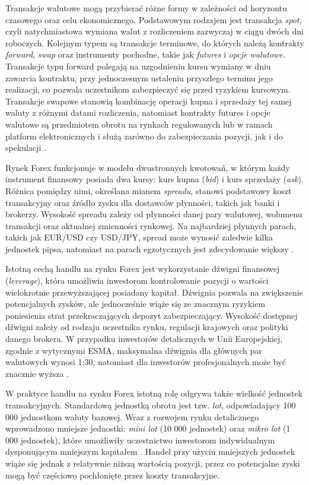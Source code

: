 Transakcje walutowe mogą przybierać różne formy w zależności od horyzontu czasowego oraz celu ekonomicznego. 
Podstawowym rodzajem jest transakcja \textit{spot}, czyli natychmiastowa wymiana walut z rozliczeniem zazwyczaj w ciągu dwóch dni roboczych. 
Kolejnym typem są transakcje terminowe, do których należą kontrakty \textit{forward}, \textit{swap} oraz instrumenty pochodne, takie jak \textit{futures} i \textit{opcje walutowe}. 
Transakcje typu forward polegają na uzgodnieniu kursu wymiany w dniu zawarcia kontraktu, przy jednoczesnym ustaleniu przyszłego terminu jego realizacji, 
co pozwala uczestnikom zabezpieczyć się przed ryzykiem kursowym. Transakcje swapowe stanowią kombinację operacji kupna i sprzedaży tej samej waluty z różnymi datami rozliczenia, 
natomiast kontrakty futures i opcje walutowe są przedmiotem obrotu na rynkach regulowanych lub w ramach platform elektronicznych i służą zarówno do zabezpieczania pozycji, 
jak i do spekulacji \parencite{hull2018}.

Rynek Forex funkcjonuje w modelu dwustronnych kwotowań, w którym każdy instrument finansowy posiada dwa kursy: kurs kupna (\textit{bid}) i kurs sprzedaży (\textit{ask}). 
Różnica pomiędzy nimi, określana mianem \textit{spreadu}, stanowi podstawowy koszt transakcyjny oraz źródło zysku dla dostawców płynności, takich jak banki i brokerzy. 
Wysokość spreadu zależy od płynności danej pary walutowej, wolumenu transakcji oraz aktualnej zmienności rynkowej. 
Na najbardziej płynnych parach, takich jak EUR/USD czy USD/JPY, spread może wynosić zaledwie kilka jednostek pipsa, natomiast na parach egzotycznych jest zdecydowanie większy \parencite{bis2022}.

Istotną cechą handlu na rynku Forex jest wykorzystanie dźwigni finansowej (\textit{leverage}), która umożliwia inwestorom kontrolowanie pozycji o wartości wielokrotnie przewyższającej posiadany kapitał. 
Dźwignia pozwala na zwiększenie potencjalnych zysków, ale jednocześnie wiąże się ze znacznym ryzykiem poniesienia strat przekraczających depozyt zabezpieczający. 
Wysokość dostępnej dźwigni zależy od rodzaju uczestnika rynku, regulacji krajowych oraz polityki danego brokera. 
W przypadku inwestorów detalicznych w Unii Europejskiej, zgodnie z wytycznymi ESMA, maksymalna dźwignia dla głównych par walutowych wynosi 1:30, 
natomiast dla inwestorów profesjonalnych może być znacznie wyższa \parencite{esma2018}.

W praktyce handlu na rynku Forex istotną rolę odgrywa także wielkość jednostek transakcyjnych. 
Standardową jednostką obrotu jest tzw. \textit{lot}, odpowiadający 100 000 jednostkom waluty bazowej. 
Wraz z rozwojem rynku detalicznego wprowadzono mniejsze jednostki: \textit{mini lot} (10 000 jednostek) oraz \textit{mikro lot} (1 000 jednostek), które umożliwiły uczestnictwo inwestorom indywidualnym dysponującym mniejszym kapitałem \parencite{madura2018}. 
Handel przy użyciu mniejszych jednostek wiąże się jednak z relatywnie niższą wartością pozycji, przez co potencjalne zyski mogą być częściowo pochłonięte przez koszty transakcyjne.

